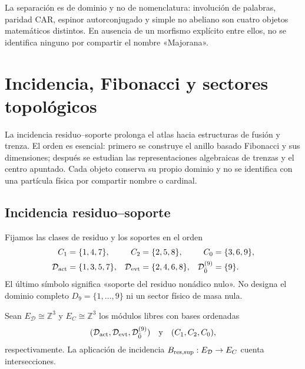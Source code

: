 La separación es de dominio y no de nomenclatura: involución de palabras,
paridad CAR, espinor autorconjugado y simple no abeliano son cuatro objetos
matemáticos distintos. En ausencia de un morfismo explícito entre ellos, no
se identifica ninguno por compartir el nombre «Majorana».

\fi

\ifdefined\HMTIncludeTopologicalBlock
\chapter[Incidencia y sectores topológicos]{Incidencia, Fibonacci y sectores topológicos}
\label{chap:incidencia-fibonacci-topologia}

La incidencia residuo--soporte prolonga el atlas hacia estructuras de fusión
y trenza. El orden es esencial: primero se construye el anillo basado
Fibonacci y sus dimensiones; después se estudian las representaciones
algebraicas de trenzas y el centro apuntado. Cada objeto conserva su propio
dominio y no se identifica con una partícula física por compartir nombre o
cardinal.

\section{Incidencia residuo--soporte}
\label{sec:incidencia-residuo-soporte}

Fijamos las clases de residuo y los soportes en el orden
\[
 \begin{aligned}
 C_1&=\{1,4,7\},&
 C_2&=\{2,5,8\},&
 C_0&=\{3,6,9\},\\
 \mathcal D_{\rm act}&=\{1,3,5,7\},&
 \mathcal D_{\rm evt}&=\{2,4,6,8\},&
 \mathcal D_{\bar0}^{(9)}&=\{9\}.
 \end{aligned}
\]
El último símbolo significa «soporte del residuo nonádico nulo». No designa
el dominio completo \(D_9=\{1,\ldots,9\}\) ni un sector físico de masa nula.

Sean \(E_{\mathcal D}\cong\mathbb Z^3\) y
\(E_C\cong\mathbb Z^3\) los módulos libres con bases ordenadas
\[
 (\mathcal D_{\rm act},\mathcal D_{\rm evt},
   \mathcal D_{\bar0}^{(9)})
 \quad\text{y}\quad
 (C_1,C_2,C_0),
\]
respectivamente. La aplicación de incidencia
\(B_{\rm res,sup}:E_{\mathcal D}\to E_C\) cuenta intersecciones.

